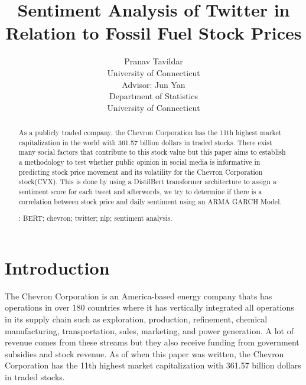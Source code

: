 \documentclass[12pt, letterpaper, titlepage]{article}
\title{Sentiment Analysis of Twitter in Relation to Fossil Fuel Stock Prices}
\author{Pranav Tavildar\\
  University of Connecticut \\
  Advisor: Jun Yan\\
  Department of Statistics\\
  University of Connecticut
}
\newcommand{\jy}[1]{\textcolor{blue}{JY: #1}}
\begin{document}
\maketitle
\doublespace

\begin{abstract}
As a publicly traded company, the Chevron Corporation has the 11th highest market capitalization in the world with 361.57 billion dollars in traded stocks. There exist many social factors that contribute to this stock value but this paper aims to establish a methodology to test whether public opinion in social media is informative in predicting stock price movement and its volatility for the Chevron Corporation stock(CVX). This is done by using a DistilBert transformer architecture to assign a sentiment score for each tweet and afterwords, we try to determine if there is a correlation between stock price and daily sentiment using an ARMA GARCH Model.


\bigskip
{}:
BERT;
chevron;
twitter;
nlp;
sentiment analysis.

\end{abstract}

\section{Introduction}
\label{sec: intro}

The Chevron Corporation is an America-based energy company thats has operations in over 180 countries where it has vertically integrated all operations in its supply chain such as exploration, production, refinement, chemical manufacturing, transportation, sales, marketing, and power generation. A lot of revenue comes from these streams but they also receive funding from government subsidies and stock revenue. As of when this paper was written, the Chevron Corporation has the 11th highest market capitalization with 361.57 billion dollars in traded stocks.
\end{document}
